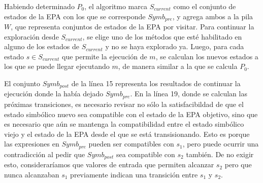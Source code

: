 Habiendo determinado $P_0$, el algoritmo marca $S_{current}$ como el conjunto de estados de la EPA con los que se corresponde $Symb_{pre}$, y agrega ambos a la pila $W$, que representa conjuntos de estados de la EPA por visitar.
Para continuar la exploración desde $S_{current}$, se elige uno de los métodos que esté habilitado en alguno de los estados de $S_{current}$ y no se haya explorado ya.
Luego, para cada estado $s \in S_{current}$ que permite la ejecución de $m$, se calculan los nuevos estados a los que se puede llegar ejecutando $m$, de manera similar a la que se calcula $P_0$.

El conjunto $Symb_{post}$ de la línea 15 representa los resultados de continuar la ejecución donde la había dejado $Symb_{pre}$.
En la línea 19, donde se calculan las próximas transiciones, es necesario revisar no sólo la satisfacibildad de que el estado simbólico nuevo sea compatible con el estado de la EPA objetivo, sino que es necesario que aún se mantenga la compatibilidad entre el estado simbólico viejo y el estado de la EPA desde el que se está transisionando.
Esto es porque las expresiones en $Symb_{pre}$ pueden ser compatibles con $s_1$, pero puede ocurrir una contradicción al pedir que $Symb_{post}$ sea compatible con $s_2$ también.
De no exigir esto, consideraríamos que valores de entrada que permiten alcanzar $s_2$ pero que nunca alcanzaban $s_1$ previamente indican una transición entre $s_1$ y $s_2$.
